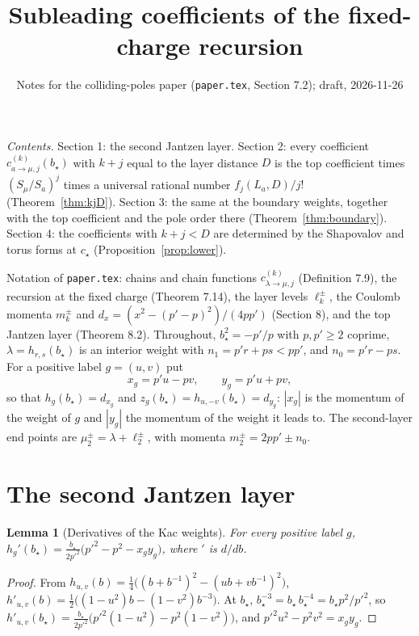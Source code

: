 \documentclass[11pt]{article}
\title{Subleading coefficients of the fixed-charge recursion}
\author{Notes for the colliding-poles paper (\texttt{paper.tex}, Section 7.2); draft, 2026-11-26}
\date{}
\newtheorem{lemma}[theorem]{Lemma}
\theoremstyle{remark}
\begin{document}
\maketitle

\noindent
\emph{Contents.}  Section 1: the second Jantzen layer.  Section 2: every
coefficient $c^{(k)}_{a\to\mu,j}(b_\star)$ with $k+j$ equal to the layer distance
$D$ is the top coefficient times $(S_\mu/S_a)^j$ times a universal rational
number $f_j(L_a,D)/j!$ (Theorem~\ref{thm:kjD}).  Section 3: the same at the
boundary weights, together with the top coefficient and the pole order there
(Theorem~\ref{thm:boundary}).  Section 4: the coefficients with $k+j<D$ are
determined by the Shapovalov and torus forms at $c_\star$
(Proposition~\ref{prop:lower}).

\noindent
Notation of \texttt{paper.tex}: chains and chain functions
$c^{(k)}_{\lambda\to\mu,j}$ (Definition 7.9), the recursion at the fixed charge
(Theorem 7.14), the layer levels $\ell^\pm_k$, the Coulomb momenta $m^\pm_k$
and $d_x=(x^2-(p'-p)^2)/(4pp')$ (Section 8), and the top Jantzen layer
(Theorem 8.2).  Throughout, $b_\star^2=-p'/p$ with $p,p'\ge2$ coprime,
$\lambda=h_{r,s}(b_\star)$ is an interior weight with $n_1=p'r+ps<pp'$, and
$n_0=p'r-ps$.  For a positive label $g=(u,v)$ put
\[
 x_g=p'u-pv,\qquad y_g=p'u+pv,
\]
so that $h_g(b_\star)=d_{x_g}$ and $z_g(b_\star)=h_{u,-v}(b_\star)=d_{y_g}$:
$|x_g|$ is the momentum of the weight of $g$ and $|y_g|$ the momentum of the
weight it leads to.  The second-layer end points are
$\mu^\pm_2=\lambda+\ell^\pm_2$, with momenta $m^\pm_2=2pp'\pm n_0$.

\section{The second Jantzen layer}

\begin{lemma}[Derivatives of the Kac weights]\label{lem:hprime}
For every positive label $g$,
$h_g'(b_\star)=\frac{b_\star}{2p'^2}\bigl(p'^2-p^2-x_gy_g\bigr)$, where $'$ is
$d/db$.
\end{lemma}

\begin{proof}
From $h_{u,v}(b)=\frac14\bigl((b+b^{-1})^2-(ub+vb^{-1})^2\bigr)$,
$h'_{u,v}(b)=\frac12\bigl((1-u^2)b-(1-v^2)b^{-3}\bigr)$.  At $b_\star$,
$b_\star^{-3}=b_\star\,b_\star^{-4}=b_\star p^2/p'^2$, so
$h'_{u,v}(b_\star)=\frac{b_\star}{2p'^2}\bigl(p'^2(1-u^2)-p^2(1-v^2)\bigr)$, and
$p'^2u^2-p^2v^2=x_gy_g$.
\end{proof}
\end{document}
